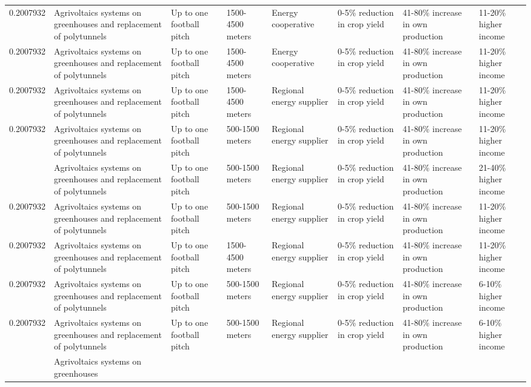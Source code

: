 \begin{table}
\begin{tabular}[t]{rlllllll}
0.2007932 & Agrivoltaics systems on greenhouses
and replacement of polytunnels & Up to one football pitch & 1500-4500 meters & Energy cooperative & 0-5\% reduction in crop yield & 41-80\% increase in own production & 11-20\% higher income\\
0.2007932 & Agrivoltaics systems on greenhouses
and replacement of polytunnels & Up to one football pitch & 1500-4500 meters & Energy cooperative & 0-5\% reduction in crop yield & 41-80\% increase in own production & 11-20\% higher income\\
0.2007932 & Agrivoltaics systems on greenhouses
and replacement of polytunnels & Up to one football pitch & 1500-4500 meters & Regional energy supplier & 0-5\% reduction in crop yield & 41-80\% increase in own production & 11-20\% higher income\\
0.2007932 & Agrivoltaics systems on greenhouses
and replacement of polytunnels & Up to one football pitch & 500-1500 meters & Regional energy supplier & 0-5\% reduction in crop yield & 41-80\% increase in own production & 11-20\% higher income\\
\addlinespace
0.2007932 & Agrivoltaics systems on greenhouses
and replacement of polytunnels & Up to one football pitch & 500-1500 meters & Regional energy supplier & 0-5\% reduction in crop yield & 41-80\% increase in own production & 21-40\% higher income\\
0.2007932 & Agrivoltaics systems on greenhouses
and replacement of polytunnels & Up to one football pitch & 500-1500 meters & Regional energy supplier & 0-5\% reduction in crop yield & 41-80\% increase in own production & 11-20\% higher income\\
0.2007932 & Agrivoltaics systems on greenhouses
and replacement of polytunnels & Up to one football pitch & 1500-4500 meters & Regional energy supplier & 0-5\% reduction in crop yield & 41-80\% increase in own production & 11-20\% higher income\\
0.2007932 & Agrivoltaics systems on greenhouses
and replacement of polytunnels & Up to one football pitch & 500-1500 meters & Regional energy supplier & 0-5\% reduction in crop yield & 41-80\% increase in own production & 6-10\% higher income\\
0.2007932 & Agrivoltaics systems on greenhouses
and replacement of polytunnels & Up to one football pitch & 500-1500 meters & Regional energy supplier & 0-5\% reduction in crop yield & 41-80\% increase in own production & 6-10\% higher income\\
\addlinespace
0.2007932 & Agrivoltaics systems on greenhouses

\end{tabular}
\end{table}
